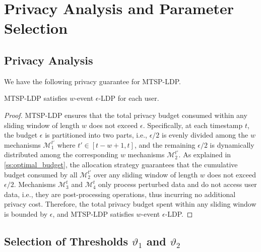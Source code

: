 \documentclass[acmsmall]{acmart}
\newcommand{\CM}{\mathcal{M}}
\begin{document}





\section{Privacy Analysis and Parameter Selection}



\subsection{Privacy Analysis}

We have the following privacy guarantee for MTSP-LDP.

\begin{theorem}
  MTSP-LDP satisfies $w$-event $\epsilon$-LDP for each user.
\end{theorem}

\begin{proof}
  MTSP-LDP ensures that the total privacy budget consumed within any sliding
  window of length $w$ does not exceed $\epsilon$.
  Specifically, at each timestamp $t$, the budget $\epsilon$ is partitioned into
  two parts, i.e., $\epsilon/2$ is evenly divided among the $w$ mechanisms
  $\CM_1^{t'}$ where $t'\in [t-w+1, t]$, and the remaining $\epsilon/2$ is
  dynamically distributed among the corresponding $w$ mechanisms $\CM_2^{t'}$.
  As explained in \cref{ss:optimal_budget}, the allocation strategy guarantees
  that the cumulative budget consumed by all $\CM_2^{t'}$ over any sliding
  window of length $w$ does not exceed $\epsilon/2$.
  Mechanisms $\CM_3^t$ and $\CM_4^t$ only process perturbed data and do not
  access user data, i.e., they are post-processing operations, thus incurring no
  additional privacy cost.
  Therefore, the total privacy budget spent within any sliding window is bounded
  by $\epsilon$, and MTSP-LDP satisfies $w$-event $\epsilon$-LDP.
\end{proof}





\subsection{Selection of Thresholds $\vartheta_1$ and $\vartheta_2$}
\end{document}
